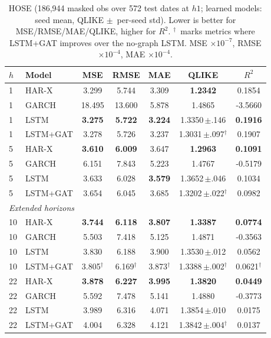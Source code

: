 \documentclass[runningheads]{llncs}
\begin{document}
\begin{table}[t]
\centering
\caption{HOSE (186{,}944 masked obs over 572 test dates at $h1$; learned models: seed mean, QLIKE
$\pm$~per-seed std). Lower is better for MSE/RMSE/MAE/QLIKE, higher for $R^2$. $^{\dagger}$~marks metrics where LSTM+GAT improves over the no-graph
LSTM. MSE $\times10^{-7}$, RMSE $\times10^{-4}$, MAE $\times10^{-4}$.}
\label{tab:hose}
\footnotesize
\setlength{\tabcolsep}{5pt}
\begin{tabular}{llccccc}
\toprule
$h$ & Model & MSE & RMSE & MAE & QLIKE & $R^2$ \\
\midrule
1  & HAR-X    & 3.299 & 5.744 & 3.309 & \textbf{1.2342} & 0.1854 \\
1  & GARCH    & 18.495 & 13.600 & 5.878 & 1.4865 & -3.5660 \\
1  & LSTM     & \textbf{3.275} & \textbf{5.722} & \textbf{3.224} & 1.3350\,$\pm$.146 & \textbf{0.1916} \\
1  & LSTM+GAT & 3.278 & 5.726 & 3.237 & 1.3031\,$\pm$.097$^{\dagger}$ & 0.1907 \\
\midrule
5  & HAR-X    & \textbf{3.610} & \textbf{6.009} & 3.647 & \textbf{1.2963} & \textbf{0.1091} \\
5  & GARCH    & 6.151 & 7.843 & 5.223 & 1.4767 & -0.5179 \\
5  & LSTM     & 3.633 & 6.028 & \textbf{3.579} & 1.3652\,$\pm$.046 & 0.1034 \\
5  & LSTM+GAT & 3.654 & 6.045 & 3.685 & 1.3202\,$\pm$.022$^{\dagger}$ & 0.0982 \\
\midrule
\multicolumn{7}{l}{\emph{Extended horizons}}\\
10 & HAR-X    & \textbf{3.744} & \textbf{6.118} & \textbf{3.807} & \textbf{1.3387} & \textbf{0.0774} \\
10 & GARCH    & 5.503 & 7.418 & 5.125 & 1.4871 & -0.3563 \\
10 & LSTM     & 3.830 & 6.188 & 3.900 & 1.3530\,$\pm$.012 & 0.0562 \\
10 & LSTM+GAT & 3.805$^{\dagger}$ & 6.169$^{\dagger}$ & 3.873$^{\dagger}$ & 1.3388\,$\pm$.002$^{\dagger}$ & 0.0621$^{\dagger}$ \\
\midrule
22 & HAR-X    & \textbf{3.878} & \textbf{6.227} & \textbf{3.995} & \textbf{1.3820} & \textbf{0.0449} \\
22 & GARCH    & 5.592 & 7.478 & 5.141 & 1.4880 & -0.3773 \\
22 & LSTM     & 3.989 & 6.316 & 4.071 & 1.3854\,$\pm$.010 & 0.0175 \\
22 & LSTM+GAT & 4.004 & 6.328 & 4.121 & 1.3842\,$\pm$.004$^{\dagger}$ & 0.0137 \\
\bottomrule
\end{tabular}
\end{table}
\end{document}

